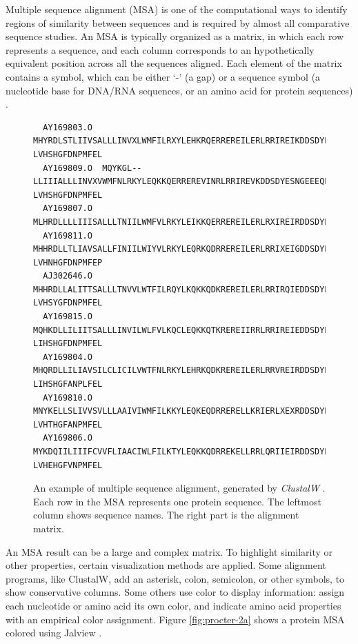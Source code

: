 Multiple sequence alignment (MSA) is one of the computational ways to identify regions of similarity between sequences and is required by almost all comparative sequence studies. An MSA is typically organized as a matrix, in which each row represents a sequence, and each column corresponds to an hypothetically equivalent position across all the sequences aligned. Each element of the matrix contains a symbol, which can be either `-' (a gap) or a sequence symbol (a nucleotide base for DNA/RNA sequences, or an amino acid for protein sequences) \cite{Edgar:2006aa}.

\begin{figure}[hb]
\scriptsize
\begin{verbatim}
  AY169803.O  MHYRDLSTLIIVSALLLINVXLWMFILRXYLEHKRQERREREILERLRRIREIKDDSDYESNGEEEQEVMD-LVHSHGFDNPMFEL
  AY169809.O  MQYKGL--LLIIIALLLINVXVWMFNLRKYLEQKKQERREREVINRLRRIREVKDDSDYESNGEEEQEVME-LVHSHGFDNPMFEL
  AY169807.O  MLHRDLLLLIIISALLLTNIILWMFVLRKYLEIKKQERREREILERLRXIREIRDDSDYESNEEEEQEVRDHLVHTFGFANPMFEI
  AY169811.O  MHHRDLLTLIAVSALLFINIILWIYVLRKYLEQRKQDRREREILERLRRIXEIGDDSDYESNEEEEQEVMD-LVHNHGFDNPMFEP
  AJ302646.O  MHHRDLLALITTSALLLTNVVLWTFILRQYLKQKKQDKREREILERLRRIRQIEDDSDYESDGTEEQEVRD-LVHSYGFDNPMFEL
  AY169815.O  MQHKDLLILIITSALLLINVILWLFVLKQCLEQKKQTKREREIIRRLRRIREIEDDSDYESNGEEEQTVRD-LIHSHGFDNPMFEL
  AY169804.O  MHQRDLLILIAVSILCLICILVWTFNLRKYLEHRKQDKREREILERLRRVREIRDDSDYESBGEEEQEVMD-LIHSHGFANPLFEL
  AY169810.O  MNYKELLSLIVVSVLLLAAIVIWMFILKKYLEQKEQDRRERELLKRIERLXEXRDDSDYESNGDEEQEVMH-LVHTHGFANPMFEL
  AY169806.O  MYKDQIILIIIFCVVFLIAACIWLFILKTYLEQKKQDRREKELLRRLQRIIEIRDDSDYESNGEEEQEVMD-LVHEHGFVNPMFEL
\end{verbatim}
\caption[Example of Multiple Sequence Alignment]{An example of multiple sequence alignment, generated by \emph{ClustalW} \cite{Thompsonaa}. Each row in the MSA represents one protein sequence. The leftmost column shows sequence names. The right part is the alignment matrix.}\label{fig:msa}
\end{figure}

An MSA result can be a large and complex matrix. To highlight similarity or other properties, certain visualization methods are applied. Some alignment programs, like ClustalW, add an asterisk, colon, semicolon, or other symbols, to show conservative columns. Some others use color to display information: assign each nucleotide or amino acid its own color, and indicate amino acid properties with an empirical color assignment. Figure \ref{fig:procter-2a} shows a protein MSA colored using Jalview \cite{Waterhouse:2009fk}.

